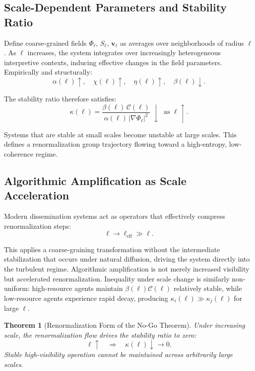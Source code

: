 \documentclass[12pt,a4paper]{article}
\newtheorem{theorem}{Theorem}
\begin{document}
\subsection{Scale-Dependent Parameters and Stability Ratio}

Define coarse-grained fields $\Phi_\ell$, $S_\ell$, $\mathbf{v}_\ell$ as averages over neighborhoods of radius $\ell$. As $\ell$ increases, the system integrates over increasingly heterogeneous interpretive contexts, inducing effective changes in the field parameters. Empirically and structurally:
\[
\alpha(\ell) \uparrow, \quad \chi(\ell) \uparrow, \quad \eta(\ell) \uparrow, \quad \beta(\ell) \downarrow.
\]

The stability ratio therefore satisfies:
\[
\kappa(\ell) = \frac{\beta(\ell)\,\mathcal{C}(\ell)}{\alpha(\ell)\,|\nabla \Phi_\ell|^2} \;\downarrow\; \text{ as } \ell \uparrow.
\]

Systems that are stable at small scales become unstable at large scales. This defines a renormalization group trajectory flowing toward a high-entropy, low-coherence regime.


\subsection{Algorithmic Amplification as Scale Acceleration}

Modern dissemination systems act as operators that effectively compress renormalization steps:
\[
\ell \rightarrow \ell_{\text{eff}} \gg \ell.
\]

This applies a coarse-graining transformation without the intermediate stabilization that occurs under natural diffusion, driving the system directly into the turbulent regime. Algorithmic amplification is not merely increased visibility but accelerated renormalization. Inequality under scale change is similarly non-uniform: high-resource agents maintain $\beta(\ell)\mathcal{C}(\ell)$ relatively stable, while low-resource agents experience rapid decay, producing $\kappa_i(\ell) \gg \kappa_j(\ell)$ for large $\ell$.

\begin{theorem}[Renormalization Form of the No-Go Theorem]
Under increasing scale, the renormalization flow drives the stability ratio to zero:
\[
\ell \uparrow \quad \Rightarrow \quad \kappa(\ell) \downarrow \rightarrow 0.
\]
Stable high-visibility operation cannot be maintained across arbitrarily large scales.
\end{theorem}
\end{document}
